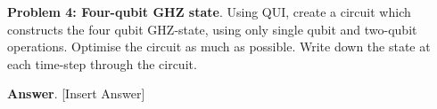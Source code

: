 \textbf{Problem 4: Four-qubit GHZ state}. Using QUI, create a circuit which constructs the four qubit GHZ-state, using only single qubit and two-qubit operations. 
Optimise the circuit as much as possible. 
Write down the state at each time-step through the circuit.


\textbf{Answer}. [Insert Answer]



